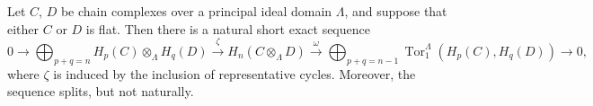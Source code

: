 Let $C$, $D$ be chain complexes over a principal ideal domain $\Lambda$, and suppose that either $C$ or $D$ is flat. Then there is a natural short exact sequence
$$0 \rightarrow \bigoplus_{p+q=n} H_p(C) \otimes_\Lambda H_q(D) \xrightarrow{\zeta} H_n(C \otimes_\Lambda D) \xrightarrow{\omega} \bigoplus_{p+q=n-1} \operatorname{Tor}_1^\Lambda(H_p(C), H_q(D)) \rightarrow 0,$$
where $\zeta$ is induced by the inclusion of representative cycles. Moreover, the sequence splits, but not naturally.
